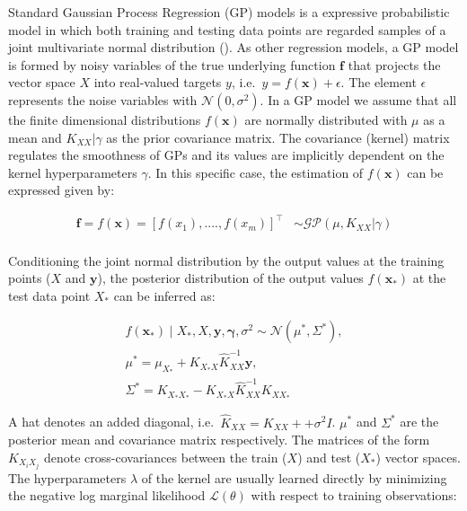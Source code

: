 \documentclass[a4paper, nobind]{templates/cdethesis}
\begin{document}
Standard Gaussian Process Regression (GP) models is a expressive probabilistic model in which both training and testing data points are regarded samples of a joint multivariate normal distribution (\cite{williams2006gaussian}). As other regression models, a GP model is formed by noisy variables of the true underlying function \(\mathbf{f}\) that projects the vector space \(X\) into real-valued targets \(y\), i.e.~\(y = f(\mathbf{x}) + \epsilon\). The element \(\epsilon\) represents the noise variables with \(\mathcal{N}(0, \sigma^{2})\). In a GP model we assume that all the finite dimensional distributions \(f(\mathbf{x})\) are normally distributed with \(\mu\) as a mean and \(K_{XX}|\gamma\) as the prior covariance matrix. The covariance (kernel) matrix regulates the smoothness of GPs and its values are implicitly dependent on the kernel hyperparameters \(\gamma\). In this specific case, the estimation of \(f(\mathbf{x})\) can be expressed given by:

\begin{equation}
\begin{aligned}
\mathbf{f} = f(\mathbf{x}) = [f(x_1), ...., f(x_m)]^\top & \sim 
\mathcal{GP}\left(
  \mu, K_{XX}|\gamma\right
) \\
\end{aligned} \label{eq:1}
\end{equation}

Conditioning the joint normal distribution by the output values at the training points
(\(X\) and \(\mathbf{y}\)), the posterior distribution of the output values \(f(\mathbf{x}_{*})\) at the test data point \(X_*\) can be inferred as:

\begin{equation}
\begin{aligned}
f(\mathbf{x}_{*}) \mid X_{*}, X, \mathbf{y}, \boldsymbol{\gamma}, \sigma^{2} \sim \mathcal{N}(\mu^{*}, \Sigma^{*}), \\
\mu^{*} = \mu_{X_*} + K_{X_*X}\widehat{K}_{XX}^{-1}\mathbf{y}, \\
\Sigma^{*} = K_{X_*X_*} - K_{X_*X}\widehat{K}_{XX}^{-1}K_{XX_*}
\end{aligned} \label{eq:2}
\end{equation}

A hat denotes an added diagonal, i.e.~\(\widehat{K}_{XX} = K_{XX} + + \sigma^{2}I\). \(\mu^{*}\) and \(\Sigma^{*}\) are the posterior mean and covariance matrix respectively. The matrices of the form \(K_{X_iX_j}\) denote cross-covariances between the train (\(X\)) and test (\(X_*\)) vector spaces. The hyperparameters \(\lambda\) of the kernel are usually learned directly by minimizing the negative log marginal likelihood \(\mathcal{L}(\theta)\) with respect to training observations:
\end{document}
